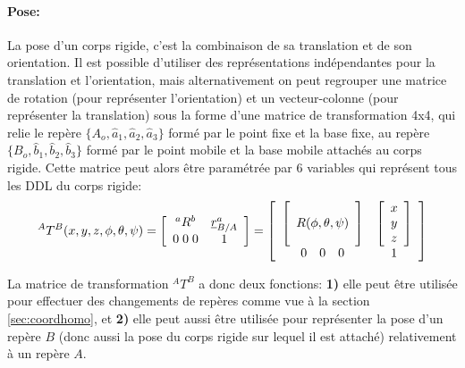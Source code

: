 \paragraph{Pose:}
La pose d'un corps rigide, c'est la combinaison de sa translation et de son orientation. Il est possible d'utiliser des représentations indépendantes pour la translation et l'orientation, mais alternativement on peut regrouper une matrice de rotation (pour représenter l'orientation) et un vecteur-colonne (pour représenter la translation)  sous la forme d'une matrice de transformation 4x4, qui relie le repère $\{A_o,\hat{a}_1,\hat{a}_2,\hat{a}_3\}$ formé par le point fixe et la base fixe, au repère $\{B_o,\hat{b}_1,\hat{b}_2,\hat{b}_3\}$ formé par le point mobile et la base mobile attachés au corps rigide. Cette matrice peut alors être paramétrée par 6 variables qui représent tous les DDL du corps rigide:
\begin{equation}
^{A}T^B(x,y,z,\phi,\theta,\psi) = \left[ \begin{array}{c c}
	^aR^b  & \underline{r}^a_{B/A} \\ 0 \; 0 \; 0 & 1
\end{array}  \right] = 
\left[ \begin{array}{c c}
\left[	\begin{array}{c} \\  R(\phi,\theta,\psi) \\ \\ \end{array} \right] & \left[ \begin{array}{c} x \\ y \\ z \end{array} \right] \\  \begin{array}{ccc} 0 & 0 & 0 \end{array}   &  1 
\end{array}  \right] 
\end{equation} 

La matrice de transformation $^{A}T^B$ a donc deux fonctions: \textbf{1)} elle peut être utilisée pour effectuer des changements de repères comme vue à la section \ref{sec:coordhomo}, et \textbf{2)} elle peut aussi être utilisée pour représenter la pose d'un repère $B$ (donc aussi la pose du corps rigide sur lequel il est attaché) relativement à un repère $A$.  


